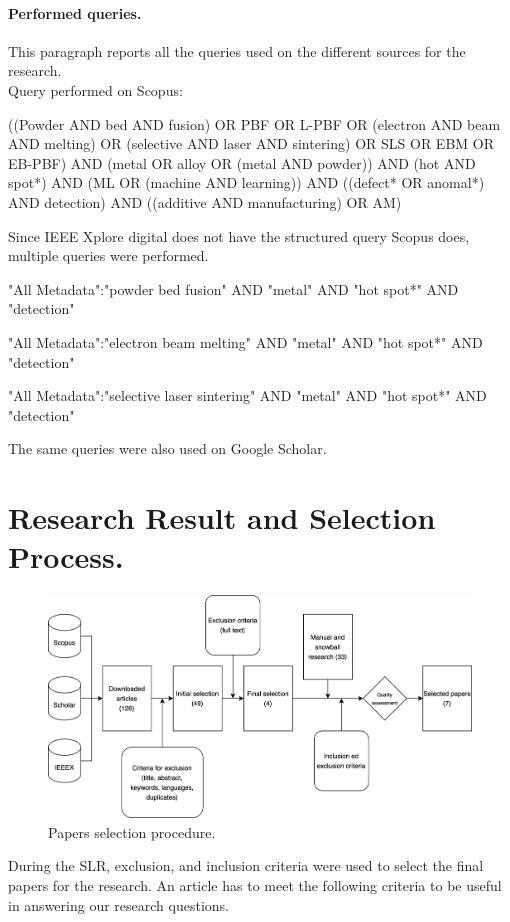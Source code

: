 \paragraph{Performed queries.} This paragraph reports all the queries used on the different sources for the research. \\[1.5ex]
Query performed on Scopus:
\begin{tcolorbox}
\footnotesize
((Powder AND bed AND fusion) OR PBF OR L-PBF OR (electron AND beam AND melting) OR (selective AND laser AND sintering) OR SLS OR EBM OR EB-PBF) AND (metal OR alloy OR (metal AND powder)) AND  (hot AND spot*) AND (ML OR (machine AND learning)) AND ((defect* OR anomal*) AND detection) AND ((additive AND manufacturing) OR AM)
\end{tcolorbox}
Since IEEE Xplore digital does not have the structured query Scopus does, multiple queries were performed.
\begin{tcolorbox}
\footnotesize
"All Metadata":"powder bed fusion" AND "metal" AND "hot spot*" AND "detection"
\end{tcolorbox}
\begin{tcolorbox}
\footnotesize
"All Metadata":"electron beam melting" AND "metal" AND "hot spot*" AND "detection"
\end{tcolorbox}
\begin{tcolorbox}
\footnotesize
"All Metadata":"selective laser sintering" AND "metal" AND "hot spot*" AND "detection"
\end{tcolorbox}
The same queries were also used on Google Scholar.

\section{Research Result and Selection Process.}
\label{sec:resresults}
\begin{figure}
    \centering
    \includegraphics[scale=0.1]{Images/selection.png}
    \caption[Papers selection procedure.] {Papers selection procedure.}
    \label{fig:selection}
\end{figure}
During the SLR, exclusion, and inclusion criteria were used to select the final papers for the research. An article has to meet the following criteria to be useful in answering our research questions.
